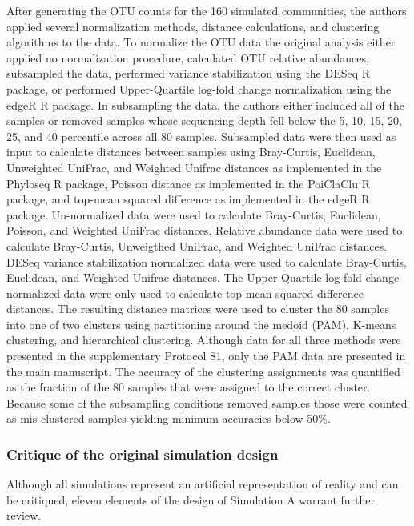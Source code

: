 \documentclass[
]{article}
\begin{document}
After generating the OTU counts for the 160 simulated communities, the
authors applied several normalization methods, distance calculations,
and clustering algorithms to the data. To normalize the OTU data the
original analysis either applied no normalization procedure, calculated
OTU relative abundances, subsampled the data, performed variance
stabilization using the DESeq R package, or performed Upper-Quartile
log-fold change normalization using the edgeR R package. In subsampling
the data, the authors either included all of the samples or removed
samples whose sequencing depth fell below the 5, 10, 15, 20, 25, and 40
percentile across all 80 samples. Subsampled data were then used as
input to calculate distances between samples using Bray-Curtis,
Euclidean, Unweighted UniFrac, and Weighted Unifrac distances as
implemented in the Phyloseq R package, Poisson distance as implemented
in the PoiClaClu R package, and top-mean squared difference as
implemented in the edgeR R package. Un-normalized data were used to
calculate Bray-Curtis, Euclidean, Poisson, and Weighted UniFrac
distances. Relative abundance data were used to calculate Bray-Curtis,
Unweigthed UniFrac, and Weighted UniFrac distances. DESeq variance
stabilization normalized data were used to calculate Bray-Curtis,
Euclidean, and Weighted Unifrac distances. The Upper-Quartile log-fold
change normalized data were only used to calculate top-mean squared
difference distances. The resulting distance matrices were used to
cluster the 80 samples into one of two clusters using partitioning
around the medoid (PAM), K-means clustering, and hierarchical
clustering. Although data for all three methods were presented in the
supplementary Protocol S1, only the PAM data are presented in the main
manuscript. The accuracy of the clustering assignments was quantified as
the fraction of the 80 samples that were assigned to the correct
cluster. Because some of the subsampling conditions removed samples
those were counted as mis-clustered samples yielding minimum accuracies
below 50\%.

\hypertarget{critique-of-the-original-simulation-design}{%
\subsubsection{Critique of the original simulation
design}\label{critique-of-the-original-simulation-design}}

Although all simulations represent an artificial representation of
reality and can be critiqued, eleven elements of the design of
Simulation A warrant further review.
\end{document}
